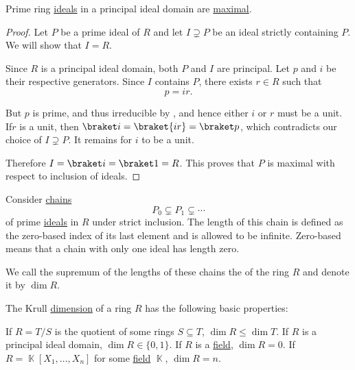 \begin{proposition}\label{thm:prime_ideals_are_maximal_in_pid}
  Prime ring \hyperref[def:prime_ring_ideal]{ideals} in a principal ideal domain are \hyperref[def:maximal_ring_ideal]{maximal}.
\end{proposition}
\begin{proof}
  Let \( P \) be a prime ideal of \( R \) and let \( I \supsetneq P \) be an ideal strictly containing \( P \). We will show that \( I = R \).

  Since \( R \) is a principal ideal domain, both \( P \) and \( I \) are principal. Let \( p \) and \( i \) be their respective generators. Since \( I \) contains \( P \), there exists \( r \in R \) such that
  \begin{equation*}
    p = ir.
  \end{equation*}

  But \( p \) is prime, and thus irreducible by , and hence either \( i \) or \( r \) must be a unit. If\LEM \( r \) is a unit, then \( \braket i = \braket {ir} = \braket p \), which contradicts our choice of \( I \supsetneq P \). It remains for \( i \) to be a unit.

  Therefore \( I = \braket i = \braket 1 = R \). This proves that \( P \) is maximal with respect to inclusion of ideals.
\end{proof}

\begin{definition}\label{def:krull_dimension}\mcite\cite[67]{Коцев2016}
  Consider \hyperref[def:tower_diagram]{chains}
  \begin{equation*}
    P_0 \subsetneq P_1 \subsetneq \cdots
  \end{equation*}
  of prime \hyperref[def:prime_ring_ideal]{ideals} in \( R \) under strict inclusion. The length of this chain is defined as the zero-based index of its last element and is allowed to be infinite. Zero-based means that a chain with only one ideal has length zero.

  We call the supremum of the lengths of these chains the  of the ring \( R \) and denote it by \( \dim R \).
\end{definition}

\begin{proposition}\label{thm:krull_dimension_properties}
  The Krull \hyperref[def:krull_dimension]{dimension} of a ring \( R \) has the following basic properties:
  \begin{propenum}
     If \( R = T / S \) is the quotient of some rings \( S \subseteq T \), \( \dim R \leq \dim T \).
     If \( R \) is a principal ideal domain, \( \dim R \in \{ 0, 1 \} \).
     If \( R \) is a \hyperref[def:field]{field}, \( \dim R = 0 \).
    \cite[exercise 8.19]{Коцев2016} If \( R = \BbbK[X_1, \ldots, X_n] \) for some \hyperref[def:field]{field} \( \BbbK \), \( \dim R = n \).
  \end{propenum}
\end{proposition}

